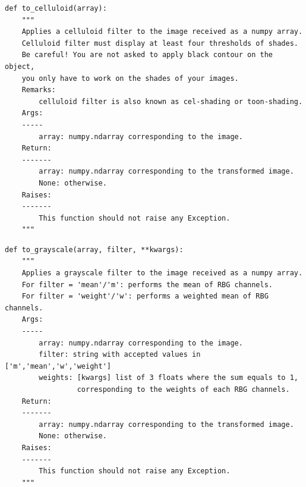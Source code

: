 \documentclass{42-en}
\begin{document}
\begin{verbatim}
def to_celluloid(array):
    """
    Applies a celluloid filter to the image received as a numpy array.
    Celluloid filter must display at least four thresholds of shades.
    Be careful! You are not asked to apply black contour on the object,
    you only have to work on the shades of your images.
    Remarks:
        celluloid filter is also known as cel-shading or toon-shading.
    Args:
    -----
        array: numpy.ndarray corresponding to the image.
    Return:
    -------
        array: numpy.ndarray corresponding to the transformed image.
        None: otherwise.
    Raises:
    -------
        This function should not raise any Exception.
    """
\end{verbatim}
\begin{verbatim}
def to_grayscale(array, filter, **kwargs):
    """
    Applies a grayscale filter to the image received as a numpy array.
    For filter = 'mean'/'m': performs the mean of RBG channels.
    For filter = 'weight'/'w': performs a weighted mean of RBG channels.
    Args:
    -----
        array: numpy.ndarray corresponding to the image.
        filter: string with accepted values in ['m','mean','w','weight']
        weights: [kwargs] list of 3 floats where the sum equals to 1,
                 corresponding to the weights of each RBG channels.
    Return:
    -------
        array: numpy.ndarray corresponding to the transformed image.
        None: otherwise.
    Raises:
    -------
        This function should not raise any Exception.
    """
\end{verbatim}
\end{document}
